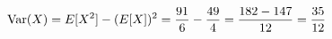 \documentclass[preview]{standalone}
\begin{document}
\begin{align*}
\special{dvisvgm:raw <g id='unique000'>}\operatorname{Var}(X)=E[X^2]-(E[X])^2=\dfrac{91}{6}-\dfrac{49}{4}=\dfrac{182-147}{12}=\dfrac{35}{12}\special{dvisvgm:raw </g>}
\end{align*}
\end{document}
